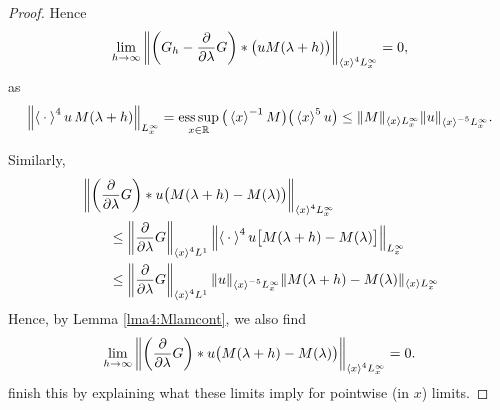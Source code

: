 \documentclass[../dissertation.tex]{subfiles}
\begin{document}
\begin{proof}
	Hence
	\begin{align} \label{eq3:??}
		\lim_{h\to\infty} 
				\left\|
					\left(G_h - \frac{\partial}{\partial \lambda}G\right)
					* \big( uM(\lambda+h)\big)
				\right\|_{\left\langle x \right\rangle^4 L_x^\infty} 
			= 0,
	\end{align}
	as 
	\begin{align*}
		\left\|
			\left\langle \kern 0.5ex \cdot \kern 0.5ex \right\rangle^4
			u\,M(\lambda+h)
		\right\|_{L_x^\infty}
		=
			\operatorname*{ess\,sup}_{x\in\mathbb R} \big(\left\langle x \right\rangle^{-1} M\big) \big(\left\langle x \right\rangle^5 u\big)
		\leq \|M\|_{\left\langle x \right\rangle L_x^\infty} \|u\|_{\left\langle x \right\rangle^{-5}L_x^\infty}.
	\end{align*}

	Similarly, 
	\begin{align*}
		&
			\left\|
				\left(\frac{\partial}{\partial \lambda} G\right)
				*
				u\big(M(\lambda+h) - M(\lambda)\big)
			\right\|_{\left\langle x \right\rangle^4 L_x^\infty} \\
		&\qquad\leq
			\left\|
				\frac{\partial}{\partial \lambda} G
			\right\|_{\left\langle x \right\rangle^4 L^1}
			\left\|	
				\left\langle \kern 0.5ex \cdot \kern 0.5ex \right\rangle^4 u 
				\big[
					M(\lambda + h) - M(\lambda)
				\big]
			\right\|_{L_x^\infty} 
			\nonumber \\
		&\qquad\leq
			\left\|
				\frac{\partial}{\partial \lambda} G
			\right\|_{\left\langle x \right\rangle^4 L^1}
			\|u\|_{\left\langle x \right\rangle^{-5} L_x^\infty}
			\|M(\lambda+h) - M(\lambda)\|_{\left\langle x \right\rangle L_x^\infty}
			\nonumber
	\end{align*}
	Hence, by Lemma \ref{lma4:Mlamcont}, we also find
	\begin{align}
		\lim_{h\to\infty}
			\left\|
				\left(\frac{\partial}{\partial \lambda} G\right)
				*
				u\big(M(\lambda+h) - M(\lambda)\big)
			\right\|_{\left\langle x \right\rangle^4 L_x^\infty} 
			=0.
	\end{align}
	{\color{red} finish this by explaining what these limits imply 
	for pointwise (in $x$) limits.}
\end{proof}




\end{document}
